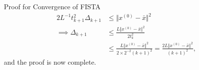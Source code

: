 \documentclass[]{article}
\theoremstyle{definition}
\begin{document}
\begin{section}{Proof for Convergence of FISTA}
        \begin{align*}
            2L^{-1}t_{k + 1}^2\Delta_{k + 1} 
            &\le \Vert x^{(0)} - \bar x\Vert^2
            \\
            \implies
            \Delta_{k + 1}
            &\le 
            \frac{L\Vert x^{(0)} - \bar x\Vert^2}{2t_k^2}
            \\
            & \le 
            \frac{L\Vert x^{(0)} - \bar x\Vert^2}{2 \times 2^{-2}(k + 1)^2}
            = 
            \frac{2L\Vert x^{(0)} - \bar x\Vert^2}{(k + 1)^2}, 
        \end{align*}
        and the proof is now complete. 
        
\end{section}



\end{document}
